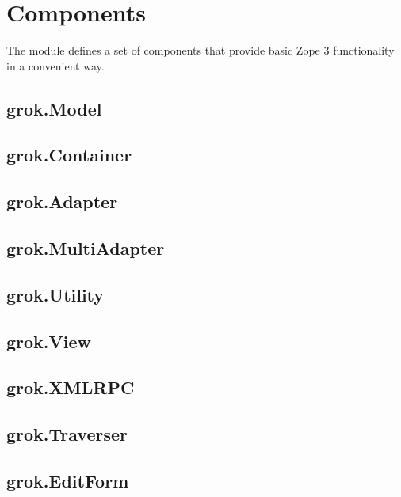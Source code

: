 \chapter{Components}

The  module defines a set of components that provide basic Zope 3
functionality in a convenient way.

    \section{grok.Model}

    \section{grok.Container}

    \section{grok.Adapter}

    \section{grok.MultiAdapter}

    \section{grok.Utility}

    \section{grok.View}

    \section{grok.XMLRPC}

    \section{grok.Traverser}

    \section{grok.EditForm}
